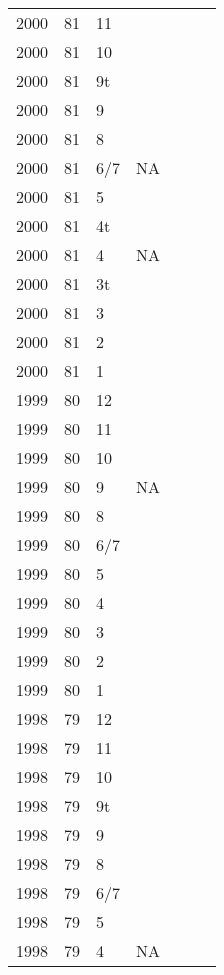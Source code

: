\begin{longtable}{ |l|l|l|l|p{2.7cm}|l|p{2cm}| }
 2000 & 81 &    11 &         &  &  & \\
 2000 & 81 &    10 &         &  &  & \\
 2000 & 81 &    9t &         &  &  & \\
 2000 & 81 &     9 &         &  &  & \\
 2000 & 81 &     8 &         &  &  & \\
 2000 & 81 &   6/7 &     NA  &  &  & \\
 2000 & 81 &     5 &         &  &  & \\
 2000 & 81 &    4t &         &  &  & \\
 2000 & 81 &     4 &     NA  &  &  & \\
 2000 & 81 &    3t &         &  &  & \\
 2000 & 81 &     3 &         &  &  & \\
 2000 & 81 &     2 &         &    &  & \\
 2000 & 81 &     1 &         &  &  & \\
 1999 & 80 &    12 &         &  &  & \\
 1999 & 80 &    11 &         &  &  & \\
 1999 & 80 &    10 &         &  &  & \\
 1999 & 80 &     9 &     NA  &  &  & \\
 1999 & 80 &     8 &         &  &  & \\
 1999 & 80 &   6/7 &         &  &  & \\
 1999 & 80 &     5 &         &  &  & \\
 1999 & 80 &     4 &         &  &  & \\
 1999 & 80 &     3 &         &  &  & \\
 1999 & 80 &     2 &         &  &  & \\
 1999 & 80 &     1 &         &  &  & \\
 1998 & 79 &    12 &         &  &  & \\
 1998 & 79 &    11 &         &  &  & \\
 1998 & 79 &    10 &         &  &  & \\
 1998 & 79 &    9t &         &  &  & \\
 1998 & 79 &     9 &         &  &  & \\
 1998 & 79 &     8 &         &  &  & \\
 1998 & 79 &   6/7 &         &  &  & \\
 1998 & 79 &     5 &         &  &  & \\
 1998 & 79 &     4 &     NA  &  &  & \\

\end{longtable}

